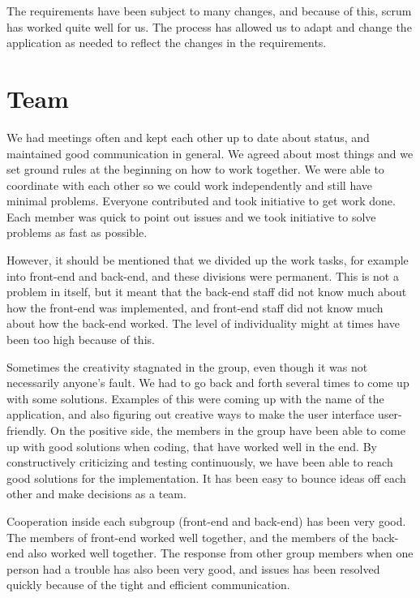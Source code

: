 The requirements have been subject to many changes, and because of this, scrum has worked quite well for us. The process has allowed us to adapt and change the application as needed to reflect the changes in the requirements.

\section{Team}

We had meetings often and kept each other up to date about status, and maintained good communication in general. We agreed about most things and we set ground rules at the beginning on how to work together. We were able to coordinate with each other so we could work independently and still have minimal problems. Everyone contributed and took initiative to get work done. Each member was quick to point out issues and we took initiative to solve problems as fast as possible.\newline

However, it should be mentioned that we divided up the work tasks, for example into front-end and back-end, and these divisions were permanent. This is not a problem in itself, but it meant that the back-end staff did not know much about how the front-end was implemented, and front-end staff did not know much about how the back-end worked. The level of individuality might at times have been too high because of this.\newline

Sometimes the creativity stagnated in the group, even though it was not necessarily anyone's fault. We had to go back and forth several times to come up with some solutions. Examples of this were coming up with the name of the application, and also figuring out creative ways to make the user interface user-friendly. On the positive side, the members in the group have been able to come up with good solutions when coding, that have worked well in the end. By constructively criticizing and testing continuously, we have been able to reach good solutions for the implementation. It has been easy to bounce ideas off each other and make decisions as a team.\newline

Cooperation inside each subgroup (front-end and back-end) has been very good. The members of front-end worked well together, and the members of the back-end also worked well together. The response from other group members when one person had a trouble has also been very good, and issues has been resolved quickly because of the tight and efficient communication.\newline

